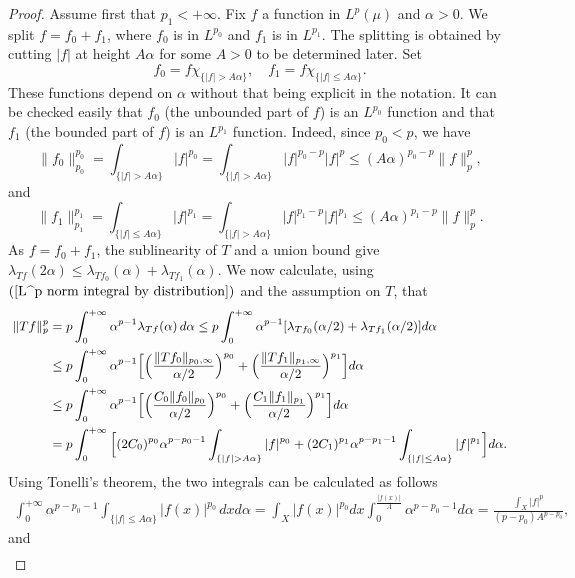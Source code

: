 \begin{proof}
Assume first that $p_1<+\infty$. Fix $f$ a function in $L^{p}(\mu)$ and $\alpha>0$. We split $f=f_0+f_1$, where $f_0$ is in $L^{p_0}$ and $f_1$ is in $L^{p_1}$. The splitting is obtained by cutting $|f|$ at height $A\alpha$ for some $A>0$ to be determined later. Set
\[f_0=f\chi_{\{|f|>A\alpha\}},\quad f_1=f\chi_{\{|f|\leq A\alpha\}}.\]
These functions depend on $\alpha$ without that being explicit in the notation. It can be checked easily that $f_0$ (the unbounded part of $f$) is an $L^{p_0}$ function and that $f_1$ (the bounded part of $f$) is an $L^{p_1}$ function. Indeed, since $p_0<p$, we have
\[\|f_0\|_{p_0}^{p_0}=\int_{\{|f|>A\alpha\}}|f|^{p_0}=\int_{\{|f|>A\alpha\}}|f|^{p_0-p}|f|^{p}\leq(A\alpha)^{p_0-p}\|f\|_{p}^{p},\]
and
\[\|f_1\|_{p_1}^{p_1}=\int_{\{|f|\leq A\alpha\}}|f|^{p_1}=\int_{\{|f|>A\alpha\}}|f|^{p_1-p}|f|^{p_1}\leq(A\alpha)^{p_1-p}\|f\|_{p}^{p}.\]
As $f=f_0+f_1$, the sublinearity of $T$ and a union bound give $\lambda_{Tf}(2\alpha)\leq\lambda_{Tf_0}(\alpha)+\lambda_{Tf_1}(\alpha)$. We now calculate, using $(\ref{L^p norm integral by distribution})$ and the assumption on $T$, that
\begin{equation*}\small
\begin{aligned}
\|Tf\|_{p}^{p}&=p\int_{0}^{+\infty}\alpha^{p-1}\lambda_{Tf}(\alpha)\,d\alpha\leq p\int_{0}^{+\infty}\alpha^{p-1}[\lambda_{Tf_0}(\alpha/2)+\lambda_{Tf_1}(\alpha/2)]d\alpha\\
&\leq p\int_{0}^{+\infty}\alpha^{p-1}\Big[\Big(\frac{\|Tf_0\|_{p_0,\infty}}{\alpha/2}\Big)^{p_0}+\Big(\frac{\|Tf_1\|_{p_1,\infty}}{\alpha/2}\Big)^{p_1}\Big]d\alpha\\
&\leq p\int_{0}^{+\infty}\alpha^{p-1}\Big[\Big(\frac{C_0\|f_0\|_{p_0}}{\alpha/2}\Big)^{p_0}+\Big(\frac{C_1\|f_1\|_{p_1}}{\alpha/2}\Big)^{p_1}\Big]d\alpha\\
&=p\int_{0}^{+\infty}\Big[(2C_0)^{p_0}\alpha^{p-p_0-1}\int_{\{|f|>A\alpha\}}|f|^{p_0}+(2C_1)^{p_1}\alpha^{p-p_1-1}\int_{\{|f|\leq A\alpha\}}|f|^{p_1}\Big]d\alpha.
\end{aligned}
\end{equation*}
Using Tonelli's theorem, the two integrals can be calculated as follows
\begin{align*}
\int_{0}^{+\infty}\alpha^{p-p_0-1}\int_{\{|f|\leq A\alpha\}}|f(x)|^{p_0}\,dx d\alpha=\int_{X}|f(x)|^{p_0}dx\int_{0}^{\frac{|f(x)|}{A}}\alpha^{p-p_0-1}d\alpha=\frac{\int_X|f|^{p}}{(p-p_0)A^{p-p_0}},
\end{align*}
and
\begin{align*}

\end{align*}
\end{proof}

